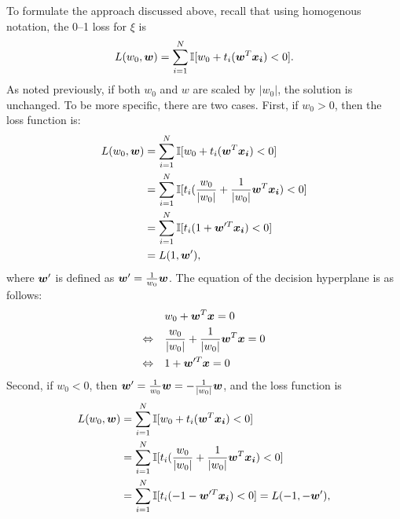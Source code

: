 To formulate the approach discussed above, 
recall that using homogenous notation, the 0--1 loss for $\xi$ is 
\begin{equation}\label{eq:loss}
L(w_0,\boldsymbol{w}) = \sum_{i=1}^N \mathbb{I} [w_0 + t_i (\boldsymbol{w}^T \boldsymbol{x_i}) < 0].
\end{equation}
%
As noted previously, if both $w_0$ and $w$ are scaled by $|w_0|$, the
solution is unchanged.  To be more specific, there are two
cases. First, if $w_0>0$, then the loss function is:
\[ \begin{split}
L(w_0,\boldsymbol{w}) &= \sum_{i=1}^N \mathbb{I} [w_0 + t_i (\boldsymbol{w}^T \boldsymbol{x_i}) < 0] \\
&=\sum_{i=1}^N \mathbb{I} [t_i (\frac{w_0}{|w_0|} + \frac{1}{|w_0|}\boldsymbol{w}^T \boldsymbol{x_i}) < 0]  \\
&= \sum_{i=1}^N \mathbb{I} [t_i (1 + \boldsymbol{w}'^T \boldsymbol{x_i}) < 0] \\
&= L(1, \boldsymbol{w}'),\\
\end{split} \]
where $\boldsymbol{w}'$ is defined as $\boldsymbol{w}' = \frac{1}{w_0}\boldsymbol{w}$. The equation of the
decision hyperplane is as follows:
\[ \begin{split} 
&w_0 + \boldsymbol{w}^T\boldsymbol{x} = 0 \\
\Leftrightarrow \quad
&\frac{w_0}{|w_0|} + \frac{1}{|w_0|} \boldsymbol{w}^T \boldsymbol{x}  = 0 \\ \Leftrightarrow \quad
&1 + \boldsymbol{w}'^T \boldsymbol{x} = 0
\end{split} \]
Second, if $w_0 < 0$, then $\boldsymbol{w}' = \frac{1}{w_0}\boldsymbol{w} = -\frac{1}{|w_0|}\boldsymbol{w}$, and the loss function is 
\[ \begin{split}
L(w_0,\boldsymbol{w}) &= \sum_{i=1}^N \mathbb{I} [w_0 + t_i (\boldsymbol{w}^T \boldsymbol{x_i}) < 0] \\
&=\sum_{i=1}^N \mathbb{I} [t_i (\frac{w_0}{|w_0|} + \frac{1}{|w_0|}\boldsymbol{w}^T \boldsymbol{x_i}) < 0]  \\
&= \sum_{i=1}^N \mathbb{I} [t_i (-1 - \boldsymbol{w}'^T \boldsymbol{x_i}) < 0] 
= L(-1, -\boldsymbol{w}'),\\
\end{split} \]

